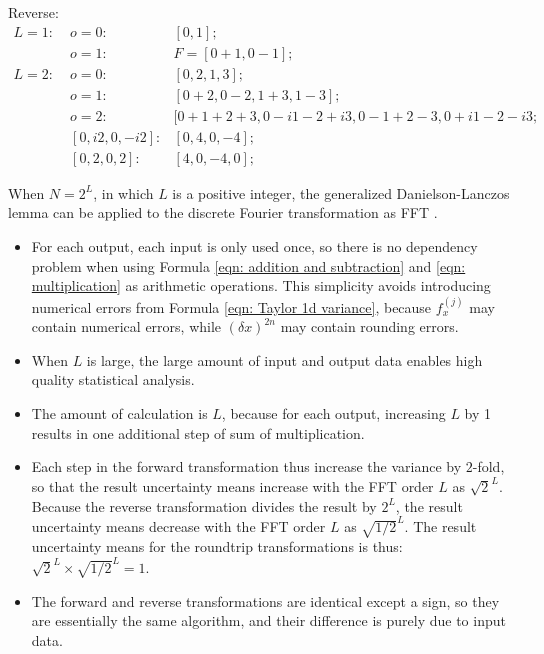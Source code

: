 \documentclass[twoside]{article}
\numberwithin{equation}{section}
\begin{document}
Reverse:
\begin{align*}
L = 1:\;& o=0: & [0, 1]; \\
 & o = 1: & F = [0 + 1, 0 - 1]; \\
L = 2:\;& o=0: & [0, 2, 1, 3]; \\
 & o = 1: & [0 + 2, 0 - 2, 1 + 3, 1 - 3]; \\
 & o = 2: & [0 + 1 + 2 + 3, 0 - i 1 - 2 + i 3 , 0 - 1 + 2 - 3, 0 + i 1 - 2 - i 3; \\
 & [0, i 2, 0, - i 2]:& [0, 4, 0, -4]; \\
 & [0, 2, 0, 2]:& [4, 0, -4, 0];
\end{align*}

\fi

When $N = 2^{L}$, in which $L$ is a positive integer, the generalized Danielson-Lanczos lemma \cite{Numerical_Recipes} can be applied to the discrete Fourier transformation as FFT \cite{Numerical_Recipes}. 
\begin{itemize}

\item For each output, each input is only used once, so there is no dependency problem when using Formula \eqref{eqn: addition and subtraction} and \eqref{eqn: multiplication} as arithmetic operations.
This simplicity avoids introducing numerical errors from Formula \eqref{eqn: Taylor 1d variance}, because $f^{(j)}_x$ may contain numerical errors, while $(\delta x)^{2n}$ may contain rounding errors.

\item When $L$ is large, the large amount of input and output data enables high quality statistical analysis.

\item The amount of calculation is $L$, because for each output, increasing $L$ by 1 results in one additional step of sum of multiplication.

\item Each step in the forward transformation thus increase the variance by $2$-fold, so that the result uncertainty means increase with the FFT order $L$ as $\sqrt{2}^L$.
Because the reverse transformation divides the result by $2^L$, the result uncertainty means decrease with the FFT order $L$ as $\sqrt{1/2}^L$.
The result uncertainty means for the roundtrip transformations is thus: $\sqrt{2}^L \times \sqrt{1/2}^L = 1$.

\item The forward and reverse transformations are identical except a sign, so they are essentially the same algorithm, and their difference is purely due to input data.  

\end{itemize}
\end{document}
